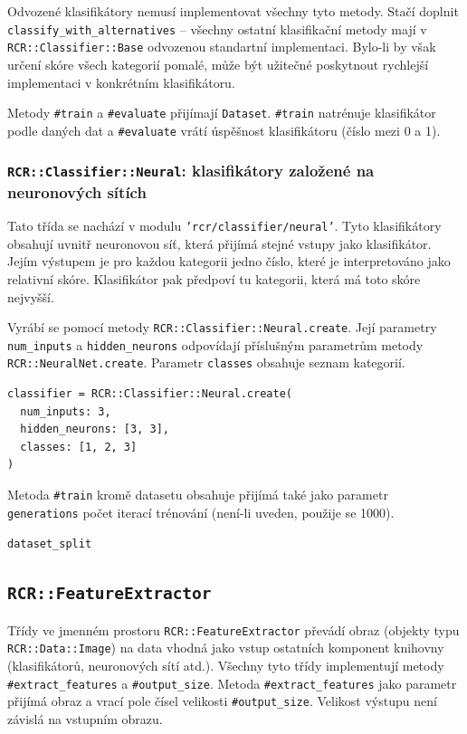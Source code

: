 \documentclass[a4paper]{article}
\begin{document}
Odvozené klasifikátory nemusí implementovat všechny tyto metody.
Stačí doplnit \texttt{classify\_with\_alternatives} -- všechny ostatní
klasifikační metody mají v \texttt{RCR::Classifier::Base} odvozenou
standartní implementaci. Bylo-li by však určení skóre všech kategorií
pomalé, může být užitečné poskytnout rychlejší implementaci v konkrétním
klasifikátoru.

Metody \texttt{\#train} a \texttt{\#evaluate} přijímají \texttt{Dataset}.
\texttt{\#train} natrénuje klasifikátor podle daných dat a \texttt{\#evaluate}
vrátí úspěšnost klasifikátoru (číslo mezi 0 a 1).

\subsubsection{\texttt{RCR::Classifier::Neural}: klasifikátory založené na
neuronových sítích}
Tato třída se nachází v modulu \texttt{'rcr/classifier/neural'}.
Tyto klasifikátory obsahují uvnitř neuronovou síť, která přijímá stejné vstupy
jako klasifikátor. Jejím výstupem je pro každou kategorii jedno číslo, které
je interpretováno jako relativní skóre. Klasifikátor pak předpoví tu kategorii,
která má toto skóre nejvyšší.

Vyrábí se pomocí metody \texttt{RCR::Classifier::Neural.create}. Její parametry
\texttt{num\_inputs} a \texttt{hidden\_neurons} odpovídají příslušným parametrům
metody \texttt{RCR::NeuralNet.create}. Parametr \texttt{classes} obsahuje seznam
kategorií.
\begin{lstlisting}
classifier = RCR::Classifier::Neural.create(
  num_inputs: 3,
  hidden_neurons: [3, 3],
  classes: [1, 2, 3]
)
\end{lstlisting}

Metoda \texttt{\#train} kromě datasetu obsahuje přijímá také jako parametr
\texttt{generations} počet iterací trénování (není-li uveden, použije se 1000).

\texttt{dataset\_split}

\subsection{\texttt{RCR::FeatureExtractor}}
Třídy ve jmenném prostoru \texttt{RCR::FeatureExtractor} převádí obraz (objekty
typu \texttt{RCR::Data::Image}) na data vhodná jako vstup ostatních komponent
knihovny (klasifikátorů, neuronových sítí atd.).
Všechny tyto třídy implementují metody \texttt{\#extract\_features} a
\texttt{\#output\_size}. Metoda \texttt{\#extract\_features} jako parametr
přijímá obraz a vrací pole čísel velikosti \texttt{\#output\_size}.
Velikost výstupu není závislá na vstupním obrazu.
\end{document}
